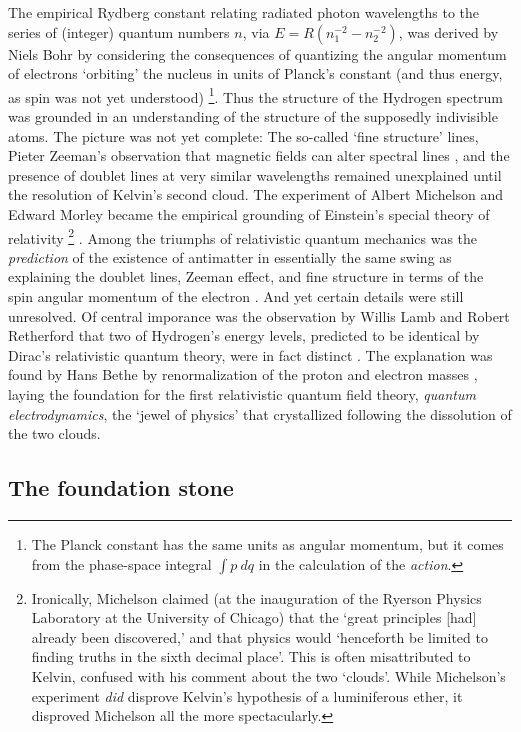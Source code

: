 	The empirical Rydberg constant relating radiated photon wavelengths to the series of (integer) quantum numbers $n$, via $E=R(n_{1}^{-2}-n_{2}^{-2})$, was derived by Niels Bohr by considering the consequences of quantizing the angular momentum of electrons `orbiting' the nucleus in units of Planck's constant (and thus energy, as spin was not yet understood) \cite{Bohr1913}
	\footnote{The Planck constant has the same units as angular momentum, but it comes from the phase-space integral $\int p~dq$ in the calculation of the \emph{action}.}.
	Thus the structure of the Hydrogen spectrum was grounded in an understanding of the structure of the supposedly indivisible atoms. 
	The picture was not yet complete: The so-called `fine structure' lines, Pieter Zeeman's observation that magnetic fields can alter spectral lines \cite{Zeeman1897}, and the presence of doublet lines at very similar wavelengths remained unexplained until the resolution of Kelvin's second cloud.
	The experiment of Albert Michelson and Edward Morley became the empirical grounding of Einstein's special theory of relativity 
	\footnote{Ironically, Michelson claimed (at the inauguration of the Ryerson Physics Laboratory at the University of Chicago) that the `great principles [had] already been discovered,' and that physics would `henceforth be limited to finding truths in the sixth decimal place'. This is often misattributed to Kelvin, confused with his comment about the two `clouds'. While Michelson's experiment \emph{did} disprove Kelvin's hypothesis of a luminiferous ether, it disproved Michelson all the more spectacularly.} \cite{Michelson1887}.
	Among the triumphs of relativistic quantum mechanics was the \emph{prediction} of the existence of antimatter in essentially the same swing as explaining the doublet lines, Zeeman effect, and fine structure in terms of the spin angular momentum of the electron \cite{DiracH}.
	And yet certain details were still unresolved. 
	Of central imporance was the observation by Willis Lamb and Robert Retherford that two of Hydrogen's energy levels, predicted to be identical by Dirac's relativistic quantum theory, were in fact distinct \cite{Lamb47,Lamb50}.
	The explanation was found by Hans Bethe by renormalization of the proton and electron masses \cite{Bethe47}, laying the foundation for the first relativistic quantum field theory, \emph{quantum electrodynamics}, the `jewel of physics' that crystallized following the dissolution of the two clouds.


	
\subsection*{The foundation stone}


